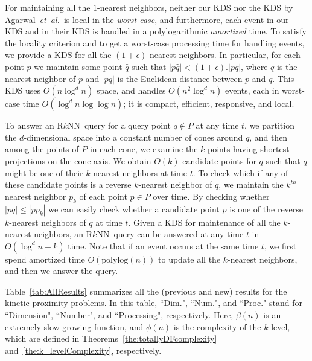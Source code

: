 \documentclass[preprint,12pt]{elsarticle}
\def\rknn{\mbox{R$k$NN}}
\newcommand{\etal}{\emph{et~al.}}
\begin{document}
For maintaining all the $1$-nearest neighbors, neither our KDS nor the KDS by Agarwal~\etal~is local in the \textit{worst-case}, and furthermore, each event in our KDS and in their KDS is handled in a polylogarithmic \textit{amortized} time. To satisfy the locality criterion and to get a worst-case processing time for handling events, we provide a KDS for all the $(1+\epsilon)$-nearest neighbors. In particular, for each point $p$ we maintain some point $\hat{q}$ such that $|p\hat{q}|<(1+\epsilon).|pq|$, where $q$ is the nearest neighbor of $p$ and $|pq|$ is the Euclidean distance between $p$ and $q$. This KDS uses $O(n\log^{d} n)$ space, and handles $O(n^2\log^d n)$ events, each in worst-case time $O(\log^d n\log\log n)$; it is compact, efficient, responsive, and local.




To answer an \rknn~query for a query point $q\notin P$ at any time $t$, we partition the $d$-dimensional space into a constant number of cones around $q$, and then among the points of $P$ in each cone, we examine the $k$ points having shortest projections on the cone axis. We obtain $O(k)$ candidate points for $q$ such that $q$ might be one of their $k$-nearest neighbors at time $t$. To check which if any of these candidate points is a reverse $k$-nearest neighbor of $q$, we maintain the $k^{th}$ nearest neighbor $p_k$ of each point $p\in P$ over time. By checking whether $|pq|\leq |pp_k|$ we can easily check whether a candidate point $p$ is one of the reverse $k$-nearest neighbors of $q$ at time $t$. Given a KDS for maintenance of all the $k$-nearest neighbors, an \rknn~query can be answered at any time $t$ in $O(\log^d n+k)$ time. Note that if an event occurs at the same time $t$, we first spend amortized time $O(\text{polylog}(n))$ to update all the $k$-nearest neighbors, and then we answer the query.

Table~\ref{tab:AllResults} summarizes all the (previous and new) results for the kinetic proximity problems.  In this table, ``Dim.", ``Num.", and ``Proc." stand for ``Dimension", ``Number", and ``Processing", respectively. Here, $\beta(n)$ is an extremely slow-growing function, and $\phi(n)$ is the complexity of the $k$-level, which are defined in Theorems~\ref{the:totallyDFcomplexity} and~\ref{the:k_levelComplexity}, respectively.
\end{document}

